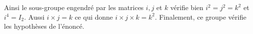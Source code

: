 \documentclass{report}
\begin{document}
\begin{exo}
\begin{q}{4}
{\begin{enumerate}
            \end{enumerate}
            Ainsi le sous-groupe engendré par les matrices \(i,j\) et \(k\)
            vérifie bien \(i^2=j^2=k^2\) et \(i^4=I_2\). Aussi \(i\times j = k\)
            ce qui donne \(i\times j\times k=k^2\). Finalement, ce groupe vérifie
            les hypothèses de l'énoncé.
        }
    \end{q}
\end{exo}
\end{document}
